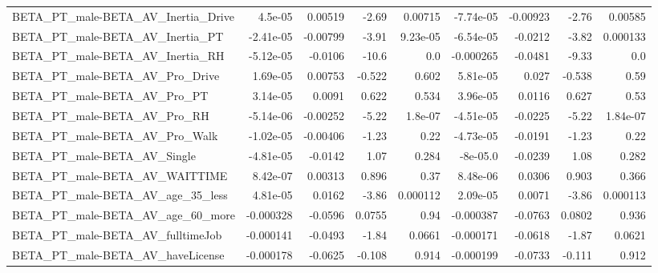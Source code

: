 \begin{tabular}{lrrrrrrrr}
BETA\_PT\_male-BETA\_AV\_Inertia\_Drive                 &     4.5e-05 &      0.00519 &    -2.69 &  0.00715 &  -7.74e-05 &    -0.00923 &        -2.76 &       0.00585 \\
BETA\_PT\_male-BETA\_AV\_Inertia\_PT                    &   -2.41e-05 &     -0.00799 &    -3.91 & 9.23e-05 &  -6.54e-05 &     -0.0212 &        -3.82 &      0.000133 \\
BETA\_PT\_male-BETA\_AV\_Inertia\_RH                    &   -5.12e-05 &      -0.0106 &    -10.6 &      0.0 &  -0.000265 &     -0.0481 &        -9.33 &           0.0 \\
BETA\_PT\_male-BETA\_AV\_Pro\_Drive                     &    1.69e-05 &      0.00753 &   -0.522 &    0.602 &   5.81e-05 &       0.027 &       -0.538 &          0.59 \\
BETA\_PT\_male-BETA\_AV\_Pro\_PT                        &    3.14e-05 &       0.0091 &    0.622 &    0.534 &   3.96e-05 &      0.0116 &        0.627 &          0.53 \\
BETA\_PT\_male-BETA\_AV\_Pro\_RH                        &   -5.14e-06 &     -0.00252 &    -5.22 &  1.8e-07 &  -4.51e-05 &     -0.0225 &        -5.22 &      1.84e-07 \\
BETA\_PT\_male-BETA\_AV\_Pro\_Walk                      &   -1.02e-05 &     -0.00406 &    -1.23 &     0.22 &  -4.73e-05 &     -0.0191 &        -1.23 &          0.22 \\
BETA\_PT\_male-BETA\_AV\_Single                        &   -4.81e-05 &      -0.0142 &     1.07 &    0.284 &   -8e-05.0 &     -0.0239 &         1.08 &         0.282 \\
BETA\_PT\_male-BETA\_AV\_WAITTIME                      &    8.42e-07 &      0.00313 &    0.896 &     0.37 &   8.48e-06 &      0.0306 &        0.903 &         0.366 \\
BETA\_PT\_male-BETA\_AV\_age\_35\_less                   &    4.81e-05 &       0.0162 &    -3.86 & 0.000112 &   2.09e-05 &      0.0071 &        -3.86 &      0.000113 \\
BETA\_PT\_male-BETA\_AV\_age\_60\_more                   &   -0.000328 &      -0.0596 &   0.0755 &     0.94 &  -0.000387 &     -0.0763 &       0.0802 &         0.936 \\
BETA\_PT\_male-BETA\_AV\_fulltimeJob                   &   -0.000141 &      -0.0493 &    -1.84 &   0.0661 &  -0.000171 &     -0.0618 &        -1.87 &        0.0621 \\
BETA\_PT\_male-BETA\_AV\_haveLicense                   &   -0.000178 &      -0.0625 &   -0.108 &    0.914 &  -0.000199 &     -0.0733 &       -0.111 &         0.912 \\

\end{tabular}
